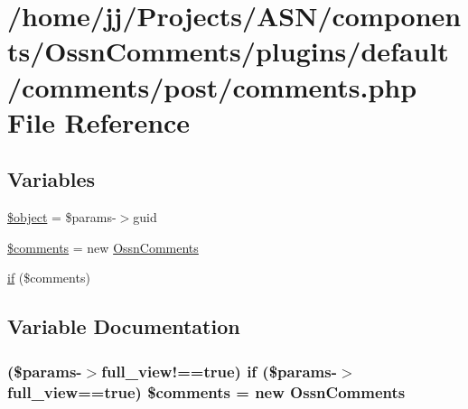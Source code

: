 \hypertarget{_ossn_comments_2plugins_2default_2comments_2post_2comments_8php}{}\section{/home/jj/\+Projects/\+A\+S\+N/components/\+Ossn\+Comments/plugins/default/comments/post/comments.php File Reference}
\label{_ossn_comments_2plugins_2default_2comments_2post_2comments_8php}
\subsection*{Variables}
\begin{DoxyCompactItemize}
\item 
\hyperlink{_ossn_comments_2plugins_2default_2comments_2post_2comments_8php_a52123b83a1952a68c5513e47d59ec4a6}{\$object} = \$params-\/$>$guid
\item 
\hyperlink{_ossn_comments_2plugins_2default_2comments_2post_2comments_8php_ab7883249cd957ff3e34deab4c90a9771}{\$comments} = new \hyperlink{class_ossn_comments}{Ossn\+Comments}
\item 
\hyperlink{_ossn_comments_2plugins_2default_2comments_2post_2comments_8php_aaad1116b99ed75ccefcdb57f6ed3fb43}{if} (\$comments)
\end{DoxyCompactItemize}


\subsection{Variable Documentation}
\subsubsection[{\texorpdfstring{\$comments}{$comments}}]{ (\$params-\/$>$full\+\_\+view!==true) {\bf if} (\$params-\/$>${\bf full\+\_\+view}==true) \$comments = new {\bf Ossn\+Comments}}\hypertarget{_ossn_comments_2plugins_2default_2comments_2post_2comments_8php_ab7883249cd957ff3e34deab4c90a9771}{}\label{_ossn_comments_2plugins_2default_2comments_2post_2comments_8php_ab7883249cd957ff3e34deab4c90a9771}


